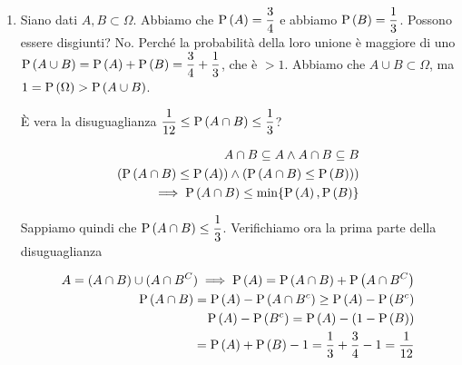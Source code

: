 \begin{enumerate}
	\item Siano dati $A,B \subset \Omega$. Abbiamo che $ \text{P}\left(A\right) = \dfrac{3}{4} $ e abbiamo $ \text{P}\left(B\right) = \dfrac{1}{3} $. Possono essere disgiunti? No. Perché la probabilità della loro unione è maggiore di uno $ \text{P}\left(A \cup B\right) = \text{P}\left(A\right) + \text{P}\left(B\right) = \dfrac{3}{4} + \dfrac{1}{3} $, che è $ > 1 $. Abbiamo che $ A \cup B \subset \Omega $, ma $ 1 = \text{P}\left(\Omega\right) > \text{P}\left(A \cup B\right) $. 
	
	È vera la disuguaglianza $ \dfrac{1}{12} \leq \text{P}\left(A \cap B\right) \leq \dfrac{1}{3} $?
	
	\[ \begin{aligned}
	A \cap B \subseteq A \land A \cap B \subseteq B \\
	(\text{P}\left(A \cap B\right) \leq \text{P}\left(A\right)) \land (\text{P}\left(A \cap B\right) \leq \text{P}\left(B\right))) \\
	\implies \text{P}\left(A \cap B\right) \leq \min\{\text{P}\left(A\right), \text{P}\left(B\right)\} \\
	\end{aligned} \]
	
	Sappiamo quindi che $ \text{P}\left(A \cap B\right) \leq \dfrac{1}{3} $. Verifichiamo ora la prima parte della disuguaglianza
	
	\[ \begin{aligned}
	A = (A \cap B) \cup (A \cap B^C) \implies \text{P}\left(A\right) = \text{P}\left(A \cap B\right) + \text{P}\left(A \cap B^C\right) \\
	\text{P}\left(A \cap B\right) = \text{P}\left(A\right) - \text{P}\left(A \cap B^c\right) \geq \text{P}\left(A\right) - \text{P}\left(B^c\right) \\
	\text{P}\left(A\right) - \text{P}\left(B^c\right) = \text{P}\left(A\right) - (1-\text{P}\left(B\right)) \\ 
	= \text{P}\left(A\right) + \text{P}\left(B\right) - 1 = \dfrac{1}{3} + \dfrac{3}{4} - 1 = \dfrac{1}{12}
	\end{aligned} \]
\end{enumerate}

